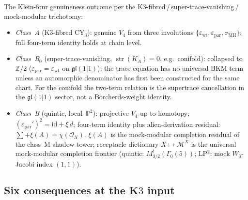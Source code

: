 \begin{remark}
\label{rem:multiproj-per-class}
The Klein-four genuineness outcome per the K$3$-fibred\,/\,super-trace-vanishing\,/\,mock-modular trichotomy:
\begin{itemize}
\item \emph{Class~A} \textup{(}K$3$-fibred CY$_3$\textup{):} genuine
 $V_4$ from three involutions
 $\{\varepsilon_{\mathrm{wt}}, \varepsilon_{\mathrm{par}},
 \sigma_{\mathrm{MH}}\}$; full four-term identity holds at
 chain level.
\item \emph{Class~B$_0$} \textup{(}super-trace-vanishing,
 $\operatorname{str}(K_A) = 0$, e.g.\ conifold\textup{):}
 collapsed to $\mathbb{Z}/2$
 \textup{(}$\varepsilon_{\mathrm{par}} = \varepsilon_{\mathrm{wt}}$
 on $\mathfrak{gl}(1\vert 1)$\textup{);} the trace equation has no
universal BKM term unless an automorphic denominator has first been
constructed for the same chart. For the conifold the two-term relation
is the supertrace cancellation in the \(\mathfrak{gl}(1\vert1)\)
sector, not a Borcherds-weight identity.
\item \emph{Class~B} \textup{(}quintic, local~$\mathbb{P}^2$\textup{):}
 projective $V_4$-up-to-homotopy;
 $(\varepsilon_{\mathrm{par}}')^2 = \mathrm{id} + \xi\, d$;
 four-term identity plus alien-derivation residual:
 $\sum + \xi(A) = \chi(\mathcal{O}_X)$. $\xi(A)$ is the
 mock-modular completion residual of the class~M shadow tower;
 receptacle dictionary $X \mapsto \mathcal{M}^X$ is the
 universal mock-modular completion frontier
 \textup{(}quintic: $M^!_{3/2}(\Gamma_0(5))$;
 LP$^2$: mock $W_3$-Jacobi index $(1, 1)$\textup{).}
\end{itemize}
\end{remark}

\subsection{Six consequences at the K\texorpdfstring{$3$}{3} input}
\label{subsec:k3-six-downstream}


